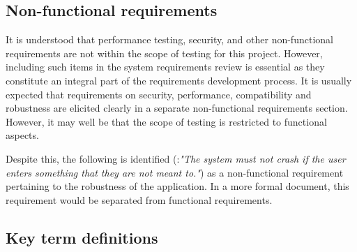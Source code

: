 \subsection{Non-functional requirements}
\label{sec:non-functional-requirements}
It is understood that performance testing, security, and other non-functional requirements are not within the scope of testing for this project.
However, including such items in the system requirements review is essential as they constitute an integral part of the requirements development process. It is usually expected that requirements on security, performance, compatibility and robustness are elicited clearly in a separate non-functional requirements section.  However, it may well be that the scope of testing is restricted to functional aspects.
\par
Despite this, the following is identified (\RSeven:\textit{"The system must not crash if the user enters something that they are not meant to."}) as a non-functional requirement pertaining to the robustness of the application. In a more formal document, this requirement would be separated from functional requirements.

%
\par

\subsection{Key term definitions}
\label{sec:key-term-definitions}

